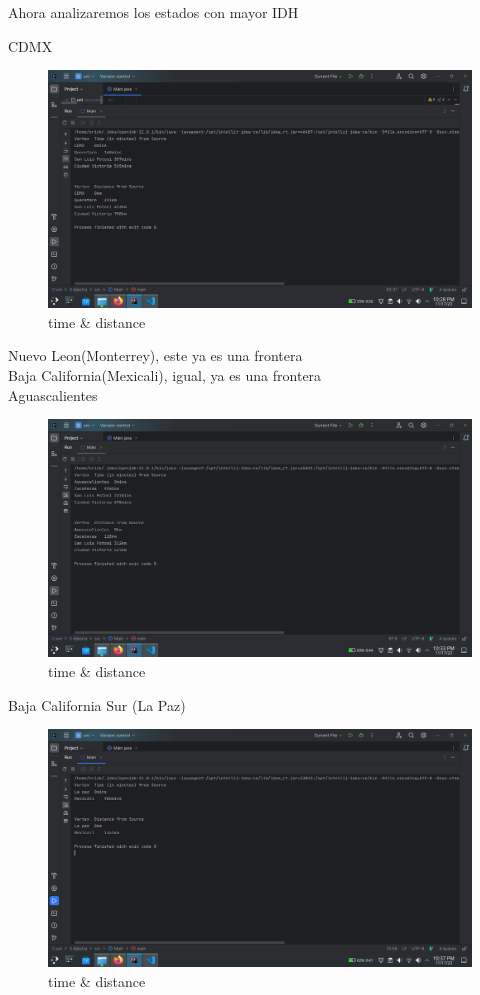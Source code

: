 \documentclass{article}
\begin{document}
Ahora analizaremos los estados con mayor IDH

CDMX

\begin{figure}[H]
  \centering
  \includegraphics[scale=0.3]{../imgs/cdmx.png}
  \caption{time \& distance}
  \label{fig:14}
\end{figure}

Nuevo Leon(Monterrey), este ya es una frontera
\\
Baja California(Mexicali), igual, ya es una frontera
\\
Aguascalientes

\begin{figure}[H]
  \centering
  \includegraphics[scale=0.3]{../imgs/aguas.png}
  \caption{time \& distance}
  \label{fig:15}
\end{figure}

Baja California Sur (La Paz)


\begin{figure}[H]
  \centering
  \includegraphics[scale=0.3]{../imgs/bcsur.png}
  \caption{time \& distance}
  \label{fig:16}
\end{figure}
\end{document}
